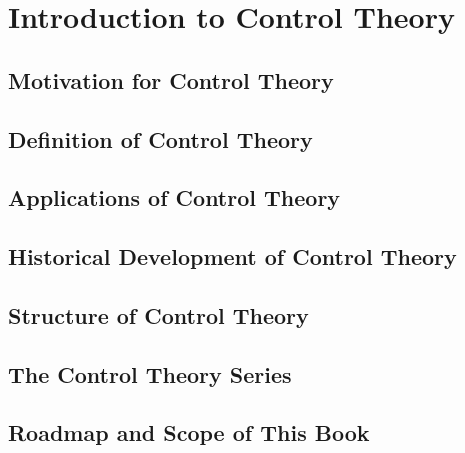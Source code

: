 \chapter{Introduction to Control Theory} \label{ch:introduction}

	\section{Motivation for Control Theory}

	\section{Definition of Control Theory}

	\section{Applications of Control Theory}

	\section{Historical Development of Control Theory}

	\section{Structure of Control Theory}

	\section{The Control Theory Series}

	\section{Roadmap and Scope of This Book}